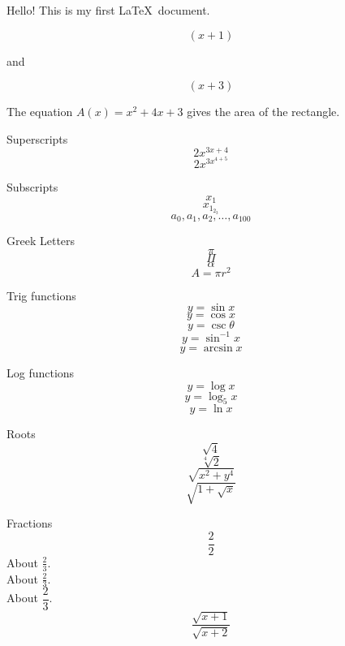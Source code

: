 \documentclass[11pt]{article}
\begin{document}
Hello! This is my first \LaTeX\ document. 

$$(x+1)$$
\begin{center}
    and
\end{center}
$$(x+3)$$ 

The equation ${A(x) = x^2 + 4x + 3}$ gives the area of the rectangle. 

Superscripts 
$$2x^{3x + 4}$$
$$2x^{3x^{4+5}}$$

Subscripts
$$x_1$$
$$x_{1_{2_3}}$$
$$a_0, a_1, a_2,\ldots, a_{100}$$

Greek Letters
$$\pi$$
$$\Pi$$
$$\alpha$$
$$A = \pi r^2$$

Trig functions
$$y = \sin x$$
$$y = \cos x$$
$$y = \csc \theta$$
$$y = \sin^{-1} x$$
$$y = \arcsin x$$

Log functions
$$y = \log x$$
$$y = \log_5 x$$
$$y = \ln x$$

Roots
$$\sqrt{4}$$
$$\sqrt[4]{2}$$
$$\sqrt{x^2 + y^4}$$
$$\sqrt{1 + \sqrt{x}}$$

Fractions
$$\frac{2}{2}$$
About $\frac{2}{3}$.\\[6pt]
About $\displaystyle \frac{2}{3}$.\\[6pt]
About $\dfrac{2}{3}$.\\[6pt]

$$\frac{\sqrt{x + 1}}{\sqrt{x + 2}}$$
\end{document}
